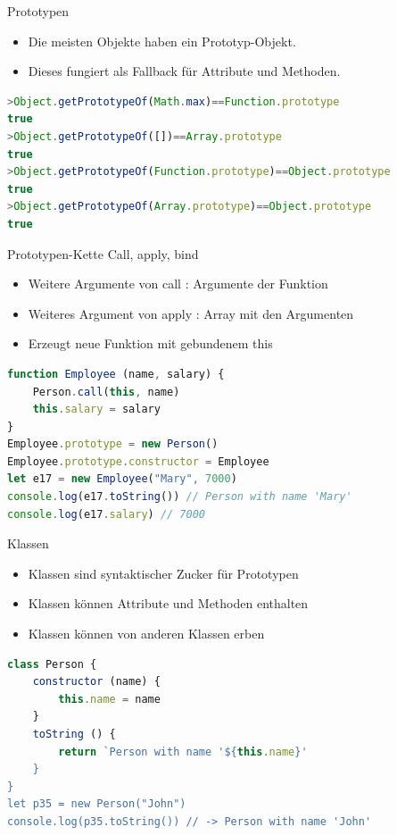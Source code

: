 \begin{definition}{Prototypen}
    \begin{itemize}
        \item Die meisten Objekte haben ein Prototyp-Objekt.
        \item Dieses fungiert als Fallback für Attribute und Methoden.
      \end{itemize}
\begin{lstlisting}[language=JavaScript, style=base, basicstyle=\ttfamily\small, numbers=none, xleftmargin=-2pt]
>Object.getPrototypeOf(Math.max)==Function.prototype
true
>Object.getPrototypeOf([])==Array.prototype
true
>Object.getPrototypeOf(Function.prototype)==Object.prototype
true
>Object.getPrototypeOf(Array.prototype)==Object.prototype
true
\end{lstlisting}
\end{definition}

\begin{code}{Prototypen-Kette}
    Call, apply, bind
    \begin{itemize}
        \item Weitere Argumente von call : Argumente der Funktion
        \item Weiteres Argument von apply : Array mit den Argumenten
        \item Erzeugt neue Funktion mit gebundenem this
    \end{itemize}
\begin{lstlisting}[language=JavaScript, style=base]
function Employee (name, salary) {
    Person.call(this, name)
    this.salary = salary
}
Employee.prototype = new Person()
Employee.prototype.constructor = Employee
let e17 = new Employee("Mary", 7000)
console.log(e17.toString()) // Person with name 'Mary' 
console.log(e17.salary) // 7000 
\end{lstlisting}
\end{code}

\begin{definition}{Klassen}
    \begin{itemize}
        \item Klassen sind syntaktischer Zucker für Prototypen
        \item Klassen können Attribute und Methoden enthalten
        \item Klassen können von anderen Klassen erben
    \end{itemize}
\begin{lstlisting}[language=JavaScript, style=base]
class Person {
    constructor (name) {
        this.name = name
    }
    toString () {
        return `Person with name '${this.name}'
    }
}
let p35 = new Person("John")
console.log(p35.toString()) // -> Person with name 'John'
\end{lstlisting}
\end{definition}

